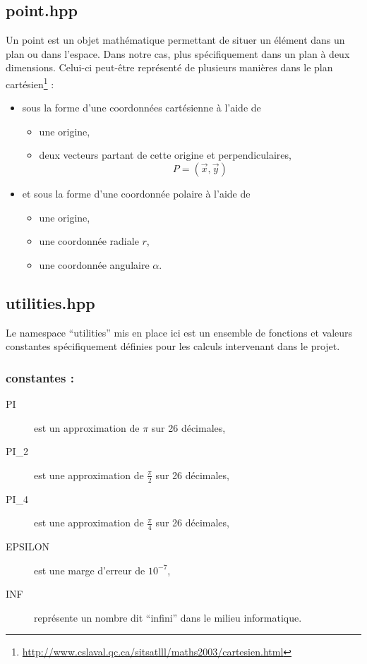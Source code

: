 \documentclass[a4paper,11pt]{report}
\begin{document}
\subsection[Point]{point.hpp}
Un point est un objet mathématique permettant de situer un élément dans un plan
ou dans l'espace. Dans notre cas, plus spécifiquement dans un plan à deux
dimensions. Celui-ci peut-être représenté de plusieurs manières dans le plan 
cartésien\footnote{\url{http://www.cslaval.qc.ca/sitsatlll/maths2003/cartesien.html}} : 
\begin{itemize}
	\item sous la forme d'une coordonnées cartésienne à l'aide de 
		\begin{itemize}
			\item une origine,
			\item deux vecteurs partant de cette origine et perpendiculaires,
				$$P = (\vec{x}, \vec{y})$$
		\end{itemize}
	\item et sous la forme d'une coordonnée polaire à l'aide de
		\begin{itemize}
			\item une origine,
			\item une coordonnée radiale $r$,
			\item une coordonnée angulaire $\alpha$.
		\end{itemize}
\end{itemize}
\subsection[Utilitaire]{utilities.hpp}
Le namespace ``utilities'' mis en place ici est un ensemble de fonctions et valeurs
constantes spécifiquement définies pour les calculs intervenant dans le projet.

\subsubsection{constantes :}
\begin{description}
	\item[PI] est un approximation de $\pi$ sur 26 décimales,
	\item[PI\_2] est une approximation de $\frac{\pi}{2}$ sur 26 décimales,
	\item[PI\_4] est une approximation de $\frac{\pi}{4}$ sur 26 décimales,
	\item[EPSILON] est une marge d'erreur de $10^{-7}$,
	\item[INF] représente un nombre dit ``infini'' dans le milieu informatique.
\end{description}
\end{document}
